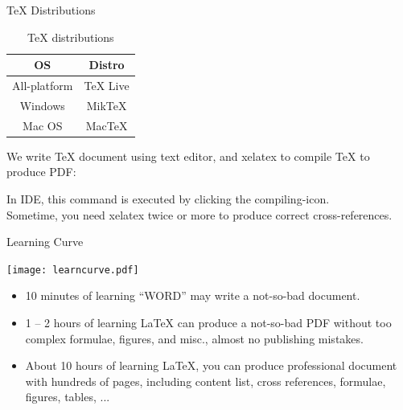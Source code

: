 \documentclass[10pt]{beamer}
\begin{document}
\begin{frame}[t]{\TeX{} Distributions}
\begin{table}
\centering
    \caption{\TeX{} distributions}
    \begin{tabular}{cc}\hline\hline
        OS          &   Distro\\\hline
        All-platform & TeX Live\\
        Windows    & MikTeX \\
        Mac OS    & MacTeX\\\hline\hline
    \end{tabular}
\end{table}

    We write \TeX{} document using text editor, and \alert{xelatex} to compile
    \TeX{} to produce PDF:\\[2ex]

\begin{center}
\end{center}

In IDE, this command is executed by clicking the compiling-icon.
\\[1ex]
Sometime, you need \alert{xelatex} twice or more to produce correct
cross-references.
\end{frame}

\begin{frame}{Learning Curve}
\begin{center}
    \texttt{[image: learncurve.pdf]}
\end{center}

\begin{itemize}
    \item 10 minutes of learning ``WORD'' may write a not-so-bad document.
    \item 1 -- 2 hours of learning \LaTeX{} can produce a not-so-bad
        PDF without too complex formulae, figures, and misc., almost
        no publishing mistakes.
    \item About 10 hours of learning \LaTeX{}, you can produce
        professional document with hundreds
        of pages, including content list, cross references,
        formulae, figures, tables, ...
\end{itemize}
\end{frame}
\end{document}
